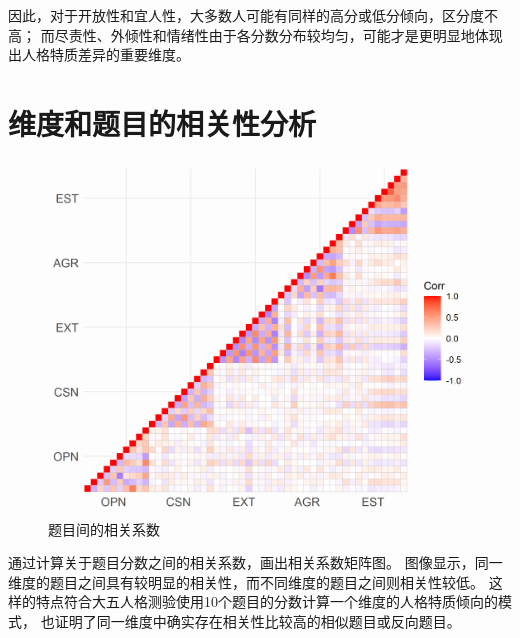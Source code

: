 \documentclass[UTF8]{ctexart}
\begin{document}
因此，对于开放性和宜人性，大多数人可能有同样的高分或低分倾向，区分度不高；
而尽责性、外倾性和情绪性由于各分数分布较均匀，可能才是更明显地体现出人格特质差异的重要维度。
\section{维度和题目的相关性分析}
\begin{figure}[H]
  \centering
  \includegraphics[scale=0.7]{Corrplot_Item.png}
  \caption{题目间的相关系数}
\end{figure}
通过计算关于题目分数之间的相关系数，画出相关系数矩阵图。
图像显示，同一维度的题目之间具有较明显的相关性，而不同维度的题目之间则相关性较低。
这样的特点符合大五人格测验使用10个题目的分数计算一个维度的人格特质倾向的模式，
也证明了同一维度中确实存在相关性比较高的相似题目或反向题目。\par
\end{document}
